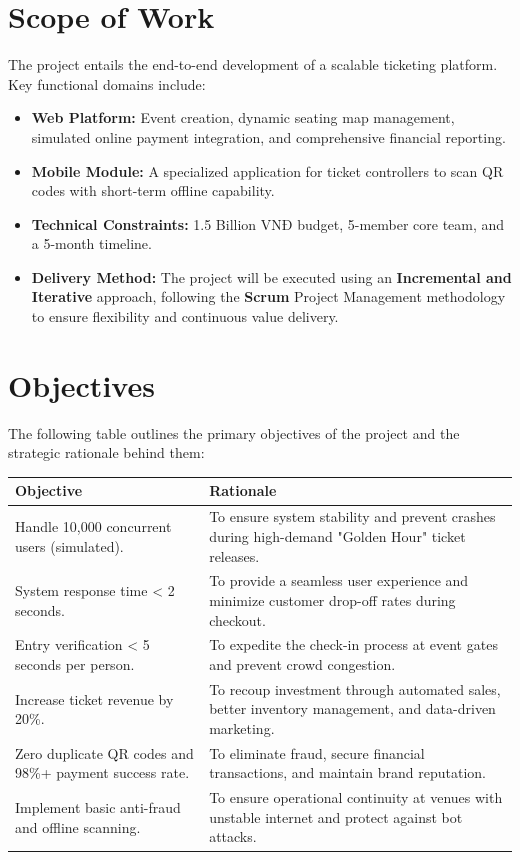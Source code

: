 \section{Scope of Work}
The project entails the end-to-end development of a scalable ticketing platform. Key functional domains include:
\begin{itemize}
    \item \textbf{Web Platform:} Event creation, dynamic seating map management, simulated online payment integration, and comprehensive financial reporting.
    \item \textbf{Mobile Module:} A specialized application for ticket controllers to scan QR codes with short-term offline capability.
    \item \textbf{Technical Constraints:} 1.5 Billion VNĐ budget, 5-member core team, and a 5-month timeline.
    \item \textbf{Delivery Method:} The project will be executed using an \textbf{Incremental and Iterative} approach, following the \textbf{Scrum} Project Management methodology to ensure flexibility and continuous value delivery.
\end{itemize}

\section{Objectives}
The following table outlines the primary objectives of the project and the strategic rationale behind them:

\begin{table}[H]
\centering
\renewcommand{\arraystretch}{1.5}
\begin{tabular}{|p{}|p{}|}
\hline
\rowcolor[HTML]{EFEFEF} 
\textbf{Objective} & \textbf{Rationale} \\ \hline
Handle 10,000 concurrent users (simulated). & To ensure system stability and prevent crashes during high-demand "Golden Hour" ticket releases. \\ \hline
System response time < 2 seconds. & To provide a seamless user experience and minimize customer drop-off rates during checkout. \\ \hline
Entry verification < 5 seconds per person. & To expedite the check-in process at event gates and prevent crowd congestion. \\ \hline
Increase ticket revenue by 20\%. & To recoup investment through automated sales, better inventory management, and data-driven marketing. \\ \hline
Zero duplicate QR codes and 98\%+ payment success rate. & To eliminate fraud, secure financial transactions, and maintain brand reputation. \\ \hline
Implement basic anti-fraud and offline scanning. & To ensure operational continuity at venues with unstable internet and protect against bot attacks. \\ \hline
\end{tabular}
\end{table}